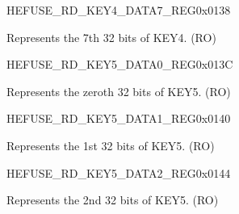 \begin{register}{H}{EFUSE\_RD\_KEY4\_DATA7\_REG}{0x0138}\label{regdesc:EFUSERDKEY4DATA7REG}
%
\regnewline%
\begin{regdesc}\begin{reglist}
\label{fielddesc:EFUSEKEY4DATA7}\item [EFUSE\_KEY4\_DATA7] Represents the 7th 32 bits of KEY4. (RO)
\end{reglist}\end{regdesc}
\end{register}


\begin{register}{H}{EFUSE\_RD\_KEY5\_DATA0\_REG}{0x013C}\label{regdesc:EFUSERDKEY5DATA0REG}
%
\regnewline%
\begin{regdesc}\begin{reglist}
\label{fielddesc:EFUSEKEY5DATA0}\item [EFUSE\_KEY5\_DATA0] Represents the zeroth 32 bits of KEY5. (RO)
\end{reglist}\end{regdesc}
\end{register}


\begin{register}{H}{EFUSE\_RD\_KEY5\_DATA1\_REG}{0x0140}\label{regdesc:EFUSERDKEY5DATA1REG}
%
\regnewline%
\begin{regdesc}\begin{reglist}
\label{fielddesc:EFUSEKEY5DATA1}\item [EFUSE\_KEY5\_DATA1] Represents the 1st 32 bits of KEY5. (RO)
\end{reglist}\end{regdesc}
\end{register}


\begin{register}{H}{EFUSE\_RD\_KEY5\_DATA2\_REG}{0x0144}\label{regdesc:EFUSERDKEY5DATA2REG}
%
\regnewline%
\begin{regdesc}\begin{reglist}
\label{fielddesc:EFUSEKEY5DATA2}\item [EFUSE\_KEY5\_DATA2] Represents the 2nd 32 bits of KEY5. (RO)
\end{reglist}\end{regdesc}
\end{register}


